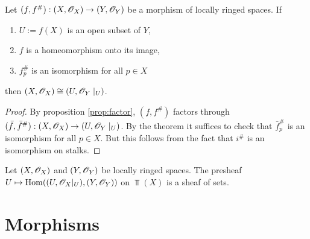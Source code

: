 \documentclass{memoir}
\begin{document}
\begin{corollary}
    Let $(f,f^\#):(X,\mathscr{O}_X)\to (Y,\mathscr{O}_Y)$ be a morphism of locally ringed spaces.
    If 
    \begin{enumerate}
        \item $U:=f(X)$ is an open subset of $Y$,
        \item $f$ is a homeomorphism onto its image,
        \item $f^\#_p$ is an isomorphism for all $p\in X$
    \end{enumerate}
    then $(X,\mathscr{O}_X)\cong (U,\mathscr{O}_Y\mid_U)$.
\end{corollary}
\begin{proof}
    By proposition \ref{prop:factor}, $(f,f^\#)$ factors through $(\bar f,\bar f^\#):(X,\mathscr{O}_X)\to (U,\mathscr{O}_Y\mid_U)$.
    By the theorem it suffices to check that $\bar f^\#_p$ is an isomorphism for all $p\in X$.
    But this follows from the fact that $i^\#$ is an isomorphism on stalks.
\end{proof}
\begin{thm}
    Let $(X,\mathscr{O}_X)$ and $(Y,\mathscr{O}_Y)$ be locally ringed spaces.
    The presheaf $U\mapsto \operatorname{Hom}((U,\mathscr{O}_X|_U),(Y,\mathscr{O}_Y))$ on $\Top(X)$ is a sheaf of sets.
\end{thm}
\section{Morphisms}
\end{document}
